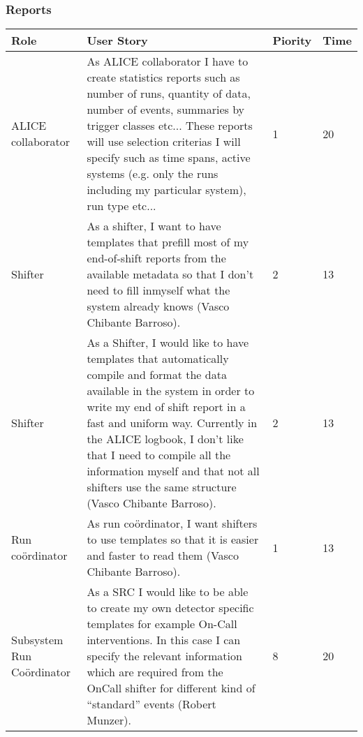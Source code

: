 \subsubsection{Reports}
\begin{longtable}{ | p{2cm} | p{8cm} | p{1.5cm} | l |}
\hline
Role & User Story & Piority & Time \\ \hline
ALICE collaborator &  As ALICE collaborator I have to create statistics reports such as number of runs, quantity of data, number of events, summaries by trigger
classes etc... These reports will use selection criterias I will specify such as time spans, active systems (e.g. only the runs including my particular system), run type etc... & 1 & 20 \\ \hline
Shifter &  As a shifter, I want to have templates that prefill most of my end-of-shift reports from the available metadata so that I don’t need to fill inmyself what the system already knows (Vasco Chibante Barroso). & 2 & 13 \\ \hline
Shifter &  As a Shifter, I would like to have templates that automatically compile and format the data available in the system in order to write my end of shift report in a fast and uniform way. Currently in the ALICE logbook, I don’t like that I need to compile all the information myself and that
not all shifters use the same structure (Vasco Chibante Barroso). & 2 & 13 \\ \hline
Run coördinator &  As run coördinator, I want shifters to use templates so that it is easier
and faster to read them (Vasco Chibante Barroso). & 1 & 13 \\ \hline
Subsystem Run Coördinator & As a SRC I would like to be able to create my own detector specific templates for example On-Call interventions. In this case I can specify the relevant information which are required from the OnCall shifter for different kind of “standard” events (Robert Munzer). & 8 & 20 \\ \hline
\end{longtable}
\newpage
